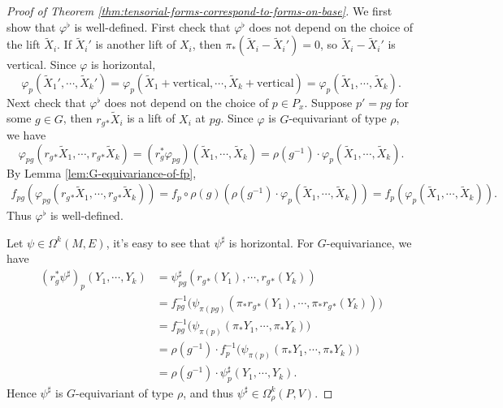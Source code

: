 \begin{proof}[Proof of Theorem \ref{thm:tensorial-forms-correspond-to-forms-on-base}]
    We first show that $\varphi^\flat$ is well-defined. First check that $\varphi^\flat$ does not depend on the choice of the lift $\tilde{X}_i$.
    If $\tilde{X}_i'$ is another lift of $X_i$, then $\pi_*(\tilde{X}_i-\tilde{X}_i')=0$, so $\tilde{X}_i-\tilde{X}_i'$ is vertical. 
    Since $\varphi$ is horizontal, 
    \begin{equation*}
        \varphi_p(\tilde{X}_1', \cdots, \tilde{X}_k') = \varphi_p(\tilde{X}_1+\text{vertical}, \cdots, \tilde{X}_k+\text{vertical}) 
        = \varphi_p(\tilde{X}_1, \cdots, \tilde{X}_k).
    \end{equation*}
    Next check that $\varphi^\flat$ does not depend on the choice of $p\in P_x$. Suppose $p'=pg$ for some $g\in G$, then 
    $r_g{}_*\tilde{X}_i$ is a lift of $X_i$ at $pg$. Since $\varphi$ is $G$-equivariant of type $\rho$, we have
    \begin{equation*}
        \varphi_{pg}(r_g{}_*\tilde{X}_1, \cdots, r_g{}_*\tilde{X}_k) 
        = (r_g^*\varphi_{pg})(\tilde{X}_1, \cdots, \tilde{X}_k)
        = \rho(g^{-1})\cdot\varphi_p(\tilde{X}_1, \cdots, \tilde{X}_k).
    \end{equation*}  
    By Lemma \ref{lem:G-equivariance-of-fp}, 
    \begin{align*}
        f_{pg}(\varphi_{pg}(r_g{}_*\tilde{X}_1, \cdots, r_g{}_*\tilde{X}_k)) 
        = f_p\circ \rho(g)(\rho(g^{-1})\cdot\varphi_p(\tilde{X}_1, \cdots, \tilde{X}_k))
        = f_p(\varphi_p(\tilde{X}_1, \cdots, \tilde{X}_k)).
    \end{align*}
    Thus $\varphi^\flat$ is well-defined. 

    Let $\psi\in\Omega^k(M, E)$, it's easy to see that $\psi^\sharp$ is horizontal. For $G$-equivariance, we have 
    \begin{align*}
        (r_g^*\psi^\sharp)_p(Y_1, \cdots, Y_k) 
        &= \psi^\sharp_{pg}(r_g{}_*(Y_1), \cdots, r_g{}_*(Y_k))\\
        &= f_{pg}^{-1}\big(\psi_{\pi(pg)}(\pi_*r_g{}_*(Y_1), \cdots, \pi_*r_g{}_*(Y_k))\big)\\
        &= f_{pg}^{-1}\big(\psi_{\pi(p)}(\pi_*Y_1, \cdots, \pi_*Y_k)\big)\\
        &= \rho(g^{-1})\cdot f_p^{-1}\big(\psi_{\pi(p)}(\pi_*Y_1, \cdots, \pi_*Y_k)\big)\\
        &= \rho(g^{-1})\cdot \psi^\sharp_p(Y_1, \cdots, Y_k).
    \end{align*}
    Hence $\psi^\sharp$ is $G$-equivariant of type $\rho$, and thus $\psi^\sharp\in\Omega^k_{\rho}(P, V)$.


\end{proof}
